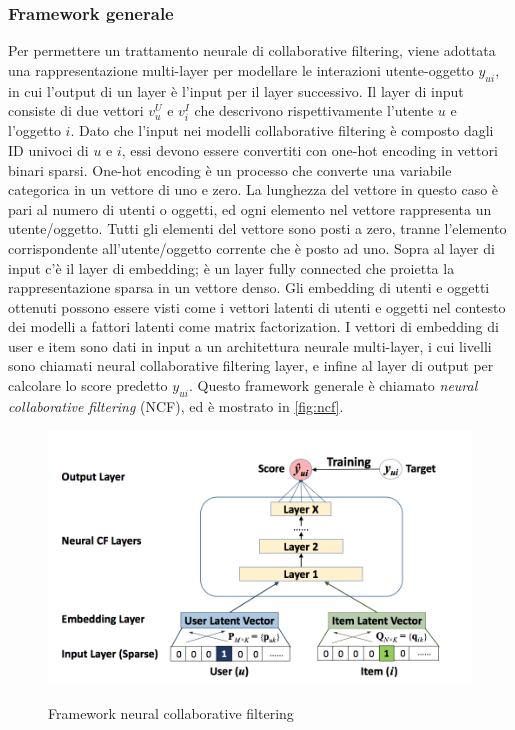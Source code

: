 \subsubsection{Framework generale}
Per permettere un trattamento neurale di collaborative filtering, viene adottata una rappresentazione multi-layer per modellare le interazioni utente-oggetto $y_{ui}$, in cui l'output di un layer è l'input per il layer successivo. Il layer di input consiste di due vettori $v_u^U$ e $v_i^I$ che descrivono rispettivamente l'utente $u$ e l'oggetto $i$. Dato che l'input nei modelli collaborative filtering è composto dagli ID univoci di $u$ e $i$, essi devono essere convertiti con one-hot encoding in vettori binari sparsi. One-hot encoding è un processo che converte una variabile categorica in un vettore di uno e zero. La lunghezza del vettore in questo caso è pari al numero di utenti o oggetti, ed ogni elemento nel vettore rappresenta un utente/oggetto. Tutti gli elementi del vettore sono posti a zero, tranne l'elemento corrispondente all'utente/oggetto corrente che è posto ad uno. Sopra al layer di input c'è il layer di embedding; è un layer fully connected che proietta la rappresentazione sparsa in un vettore denso. Gli embedding di utenti e oggetti ottenuti possono essere visti come i vettori latenti di utenti e oggetti nel contesto dei modelli a fattori latenti come matrix factorization. I vettori di embedding di user e item sono dati in input a un architettura neurale multi-layer, i cui livelli sono chiamati neural collaborative filtering layer, e infine al layer di output per calcolare lo score predetto $y_{ui}$. Questo framework generale è chiamato \textit{neural collaborative filtering} (NCF), ed è mostrato in \autoref{fig:ncf}.

\begin{figure}
  \centering
  \includegraphics[width=\linewidth]{immagini/ncf.png}
  \caption{Framework neural collaborative filtering}
  \cite{NCF}
  \label{fig:ncf}
\end{figure}

